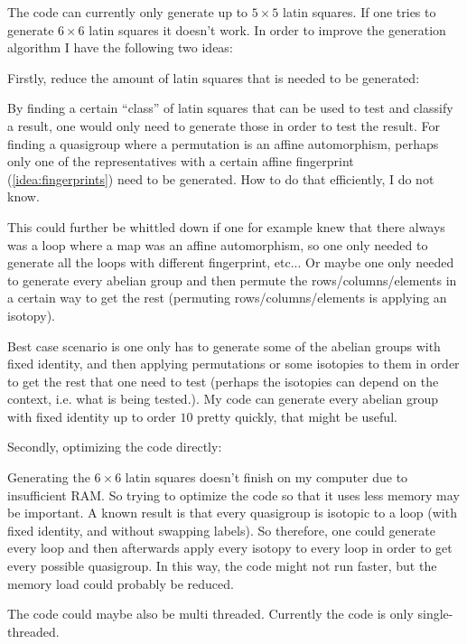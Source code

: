 \begin{idea} \label{idea:code-improvements}
    The code can currently only generate up to \( 5 \times 5 \) latin squares. If one tries to generate \( 6 \times 6 \) latin squares it doesn't work. In order to improve the generation algorithm I have the following two ideas:
    
    Firstly, reduce the amount of latin squares that is needed to be generated:

    By finding a certain ``class'' of latin squares that can be used to test and classify a result, one would only need to generate those in order to test the result. For finding a quasigroup where a permutation is an affine automorphism, perhaps only one of the representatives with a certain affine fingerprint (\autoref{idea:fingerprints}) need to be generated. How to do that efficiently, I do not know. 
    
    This could further be whittled down if one for example knew that there always was a loop where a map was an affine automorphism, so one only needed to generate all the loops with different fingerprint, etc... Or maybe one only needed to generate every abelian group and then permute the rows/columns/elements in a certain way to get the rest (permuting rows/columns/elements is applying an isotopy).
    
    Best case scenario is one only has to generate some of the abelian groups with fixed identity, and then applying permutations or some isotopies to them in order to get the rest that one need to test (perhaps the isotopies can depend on the context, i.e. what is being tested.). My code can generate every abelian group with fixed identity up to order \( 10 \) pretty quickly, that might be useful.

    Secondly, optimizing the code directly:

    Generating the \( 6 \times 6 \) latin squares doesn't finish on my computer due to insufficient RAM. So trying to optimize the code so that it uses less memory may be important. A known result is that every quasigroup is isotopic to a loop (with fixed identity, and without swapping labels). So therefore, one could generate every loop and then afterwards apply every isotopy to every loop in order to get every possible quasigroup. In this way, the code might not run faster, but the memory load could probably be reduced.

    The code could maybe also be multi threaded. Currently the code is only single-threaded.


\end{idea}
